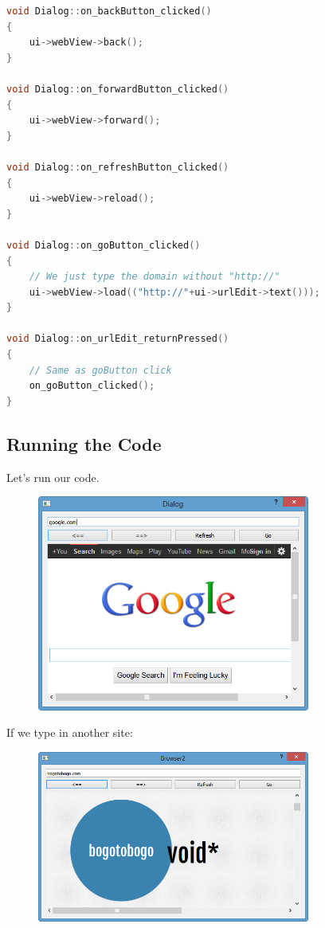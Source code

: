 \begin{lstlisting}[language=c++, numbers=none]
void Dialog::on_backButton_clicked()
{
    ui->webView->back();
}

void Dialog::on_forwardButton_clicked()
{
    ui->webView->forward();
}

void Dialog::on_refreshButton_clicked()
{
    ui->webView->reload();
}

void Dialog::on_goButton_clicked()
{
    // We just type the domain without "http://"
    ui->webView->load(("http://"+ui->urlEdit->text()));
}

void Dialog::on_urlEdit_returnPressed()
{
    // Same as goButton click
    on_goButton_clicked();
}
\end{lstlisting}

\subsection{Running the Code}\label{running-the-code}

Let's run our code.

\begin{figure}[htbp]
\centering
\includegraphics[width=0.8\textwidth]{images/Browser2RunA.png}
\caption{}
\end{figure}

If we type in another site:

\begin{figure}[htbp]
\centering
\includegraphics[width=0.8\textwidth]{images/Browser2RunB.png}
\caption{}
\end{figure}


